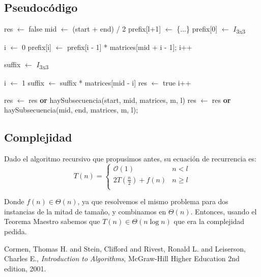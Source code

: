 \subsection{Pseudocódigo}

\begin{algorithmic}


    \State {}
  \EndIf

    \State {}
  \EndIf
    
  \State 
  
  \State res $\gets$ false
  \State mid $\gets$ (start + end) / 2
  \State prefix[l+1] $\gets$ \{...\}
  \State prefix[0] $\gets$ $I$\textsubscript{3x3}
  
  \State 
  
  \State i $\gets$ 0
    \State prefix[i] $\gets$ prefix[i - 1] * matrices[mid + i - 1];
    \State i++
  \EndWhile
  
  \State
  \State suffix $\gets$ $I$\textsubscript{3x3}
  \State
  
  \State i $\gets$ 1
    \State suffix $\gets$ suffix * matrices[mid - i]
      \State res $\gets$ true
    \EndIf
    \State i++
  \EndWhile
  
  \State
  
  \State res $\gets$ res \textbf{or} haySubsecuencia(start, mid, matrices, m, l)
  \State res $\gets$ res \textbf{or} haySubsecuencia(mid, end, matrices, m, l);
  
  
\EndFunction

\end{algorithmic}


\subsection{Complejidad}
Dado el algoritmo recursivo que propusimos antes, su ecuación de recurrencia es:
\newline
 \[ T(n) =  \begin{cases} 
      \mathcal{O}(1) & n < l \\
      2 T(\frac{n}{2}) + f(n) & n \geq l \\ 
   \end{cases}
 \]

Donde $f(n) \in \Theta(n)$, ya que resolvemos el mismo problema para dos instancias de la mitad de tamaño, y combinamos
en $\Theta(n)$. Entonces, usando el Teorema Maestro\cite{cormen_algo} sabemos que
$T(n) \in \Theta(n\log{}n)$ que era la complejidad pedida.

\begin{thebibliography}{9}

  Cormen, Thomas H. and Stein, Clifford and Rivest, Ronald L. and Leiserson, Charles E.,
  \emph{Introduction to Algorithms},
  McGraw-Hill Higher Education
  2nd edition,
  2001.

\end{thebibliography}

